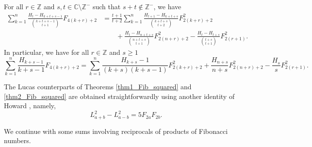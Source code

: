 \documentclass[12pt,reqno]{article}
\begin{document}
	\begin{theorem}\label{thm2_Fib_squared}
		For all $r\in\mathbb Z$ and $s,t\in\mathbb C\setminus\mathbb Z^{-}$ such that $s+t\not\in\mathbb Z^{-}$, we have
		\begin{equation}
			\begin{split}
				\sum_{k = 1}^n \frac{H_t - H _{k + t + s - 1}}{\binom{k + t + s - 1}{t + 1}} F_{4(k+r)+2} &=
				\frac{t + 1}{t + 2} \sum_{k = 1}^n \frac{H_{t+1} - H_{k + t + s}}{\binom{k + t + s}{t + 2}} F_{2(k+r)+2}^2 \\
				&\qquad + \frac{H_t - H_{n + t + s}}{\binom{n + t + s}{t + 1}} F_{2(n+r)+2}^2 - \frac{H_t - H_{t + s}}{\binom{t + s}{t + 1}} F_{2(r+1)}^2.
			\end{split}
		\end{equation}
		In particular, we have for all $r\in\mathbb Z$ and $s\geq 1$
		\begin{equation}
			\sum_{k = 1}^n \frac{H_{k+s-1}}{k + s - 1} F_{4(k+r)+2} = \sum_{k = 1}^n \frac{H_{k+s}-1}{(k+s)(k+s-1)} F_{2(k+r)+2}^2
			+ \frac{H_{n+s}}{n+s} F_{2(n+r)+2}^2 - \frac{H_s}{s} F_{2(r+1)}^2.
		\end{equation}
	\end{theorem}
	
	\begin{remark}
		The Lucas counterparts of Theorems \ref{thm1_Fib_squared} and \ref{thm2_Fib_squared} are obtained straightforwardly using another
		identity of Howard \cite{Howard03}, namely,
		\begin{equation*}
			L_{a+b}^2 - L_{a-b}^2 = 5 F_{2a} F_{2b}.
		\end{equation*}
	\end{remark}
	
	We continue with some sums involving reciprocals of products of Fibonacci numbers.
	
\end{document}
